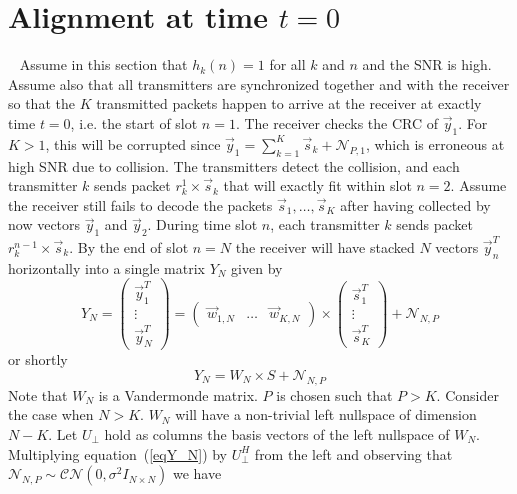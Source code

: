 \documentclass[10pt, a4paper, twocolumn]{IEEEtran}
\begin{document}
\section{Alignment at time $t=0$}~\label{sec3}
Assume in this section that $h_k(n) = 1$ for all $k$ and $n$ and the SNR is high. Assume also that all transmitters are synchronized together and with the receiver so that the $K$ transmitted packets happen to arrive at the receiver at exactly time $t=0$, i.e. the start of slot $n=1$. The receiver checks the CRC of $\overrightarrow{y}_1$. For $K>1$, this will be corrupted since $\overrightarrow{y}_1 = \sum_{k=1}^{K}\overrightarrow{s}_k + \mathcal{N}_{P,1}$, which is erroneous at high SNR due to collision. The transmitters detect the collision, and each transmitter $k$ sends packet $r_k^1 \times \overrightarrow{s}_k$ that will exactly fit within slot $n=2$. Assume the receiver still fails to decode the packets $\overrightarrow{s}_1,\dots,\overrightarrow{s}_K$ after having collected by now vectors $\overrightarrow{y}_1$ and $\overrightarrow{y}_2$. During time slot $n$, each transmitter $k$ sends packet $r_k^{n-1}\times \overrightarrow{s}_k$. By the end of slot $n=N$ the receiver will have stacked $N$ vectors $\overrightarrow{y}_n^T$ horizontally into a single matrix $Y_N$ given by
\begin{equation}
\label{eqY_Ndetailed}
Y_N = \begin{pmatrix}
\overrightarrow{y}_1^T\\
\vdots\\
\overrightarrow{y}_N^T
\end{pmatrix} = \begin{pmatrix}
\overrightarrow{w}_{1,N} & \hdots & \overrightarrow{w}_{K,N}
\end{pmatrix} \times \begin{pmatrix}
\overrightarrow{s}_1^T\\
\vdots\\
\overrightarrow{s}_K^T
\end{pmatrix} + \mathcal{N}_{N,P}
\end{equation}
\noindent or shortly
\begin{equation}
\label{eqY_N}
Y_N = W_N\times S + \mathcal{N}_{N,P}
\end{equation}
\noindent Note that $W_N$ is a Vandermonde matrix. $P$ is chosen such that $P>K$. Consider the case when $N>K$. $W_N$ will have a non-trivial left nullspace of dimension $N-K$. Let $U_{\bot}$ hold as columns the basis vectors of the left nullspace of $W_N$. Multiplying equation~(\ref{eqY_N}) by $U_{\bot}^H$ from the left and observing that $\mathcal{N}_{N,P}\sim\mathcal{CN}(0,\sigma^2 I_{N\times N})$ we have 
\end{document}
